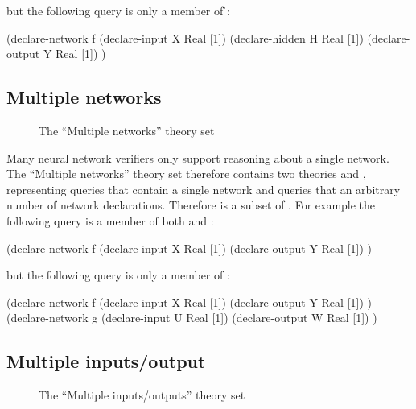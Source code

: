 but the following query is only a member of \h{}:

\begin{code}[style=lbnf]
(declare-network f
    (declare-input  X Real [1])
    (declare-hidden H Real [1])
    (declare-output Y Real [1])
)
\end{code}

\subsection{Multiple networks}

\begin{figure}[h]
\centering
{}
\caption{The ``Multiple networks'' theory set}
\label{fig:multiple-networks-theory-set}
\end{figure}

Many neural network verifiers only support reasoning about a single network. The ``Multiple networks'' theory set therefore contains two theories \snet{} and \mnet{}, representing queries that contain a single network and queries that an arbitrary number of network declarations. Therefore \snet{} is a subset of \mnet{}. For example the following query is a member of both \snet{} and \mnet{}:

\begin{code}[style=lbnf]
(declare-network f
    (declare-input  X Real [1])
    (declare-output Y Real [1])
)
\end{code}

but the following query is only a member of \mnet{}:

\begin{code}[style=lbnf]
(declare-network f
    (declare-input  X Real [1])
    (declare-output Y Real [1])
)
(declare-network g
    (declare-input  U Real [1])
    (declare-output W Real [1])
)
\end{code}

\subsection{Multiple inputs/output}

\begin{figure}[h]
\centering
{}
\caption{The ``Multiple inputs/outputs'' theory set}
\label{fig:multiple-inputs-outputs-set}
\end{figure}

